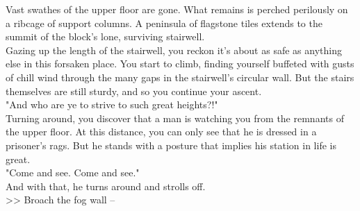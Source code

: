 Vast swathes of the upper floor are gone. What remains is perched perilously on a ribcage of support columns. A peninsula of flagstone tiles extends to the summit of the block's lone, surviving stairwell.\\

Gazing up the length of the stairwell, you reckon it's about as safe as anything else in this forsaken place. You start to climb, finding yourself buffeted with gusts of chill wind through the many gaps in the stairwell's circular wall. But the stairs themselves are still sturdy, and so you continue your ascent.\\

"And who are ye to strive to such great heights?!"\\

Turning around, you discover that a man is watching you from the remnants of the upper floor. At this distance, you can only see that he is dressed in a prisoner's rags. But he stands with a posture that implies his station in life is great.\\

"Come and see. Come and see."\\

And with that, he turns around and strolls off.\\

>> Broach the fog wall -- \\